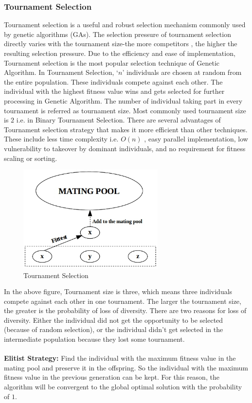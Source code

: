 \documentclass[a4paper, 12pt]{article}
\begin{document}
\subsubsection{Tournament Selection}
Tournament selection is a useful and robust selection mechanism commonly used by genetic algorithms (GAs). The selection pressure of
tournament selection directly varies with the tournament size-the more competitors , the higher the resulting selection pressure. Due to the 
efficiency and ease of implementation, Tournament selection is the most popular selection technique of Genetic Algorithm. In Tournament 
Selection, ‘$n$’ individuals are chosen at random from the entire population. These individuals compete against each other. The individual with 
the highest fitness value wins and gets selected for further processing in Genetic Algorithm. The number of individual taking part in every 
tournament is referred as tournament size. Most commonly used tournament size is $2$ i.e. in Binary Tournament Selection. There are several advantages of Tournament selection strategy that makes it more efficient than other techniques. These include less time complexity i.e. $O\left(n\right)$ , easy 
parallel implementation, low vulnerability to takeover by dominant individuals, and no requirement for fitness scaling or sorting.\\
\noindent
\begin{figure}[h]
\centering
\includegraphics[width=0.65\textwidth, clip]{./tournament.jpg}
\vspace{-0.15in}
\caption{Tournament Selection}
\label{fig:5}
\end{figure}
In the above figure, Tournament size is three, which means three individuals compete against each other in one tournament. The larger the 
tournament size, the greater is the probability of loss of diversity. There are two reasons for loss of diversity. Either the individual did 
not get the opportunity to be selected (because of random selection), or the individual didn’t get selected in the intermediate population 
because they lost some tournament.\\
\\\textbf{Elitist Strategy:}
Find the individual with the maximum fitness value in the mating pool and preserve it in the offspring. So the individual with the maximum 
fitness value in the previous generation can be kept. For this reason, the algorithm will be convergent to the global optimal solution with the
probability of $1$.
\end{document}
